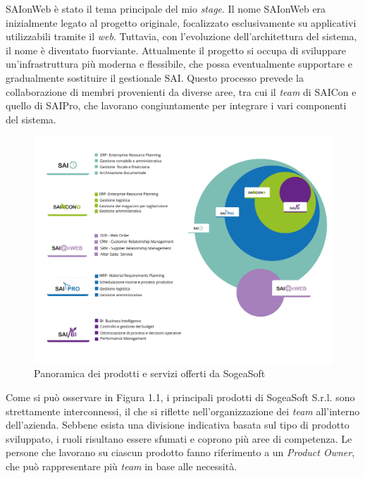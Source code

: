     \noindent SAIonWeb è stato il tema principale del mio \textit{stage}. Il nome SAIonWeb era inizialmente legato al progetto originale, focalizzato esclusivamente su applicativi utilizzabili tramite il \textit{web}. Tuttavia, con l'evoluzione dell'architettura del sistema, il nome è diventato fuorviante. Attualmente il progetto si occupa di sviluppare un'infrastruttura più moderna e flessibile, che possa eventualmente supportare e gradualmente sostituire il gestionale SAI. 
    Questo processo prevede la collaborazione di membri provenienti da diverse aree, tra cui il \textit{team} di SAICon e quello di SAIPro, che lavorano congiuntamente per integrare i vari componenti del sistema.\\

    \begin{figure}
        \centering
        \includegraphics[width=0.9\linewidth]{BCS-Tessi/images/SOGEAProdotti.png}
        \caption{Panoramica dei prodotti e servizi offerti da SogeaSoft}
        \label{fig:panoramica_prodotti}
    \end{figure}

    \noindent Come si può osservare in Figura 1.1, i principali prodotti di SogeaSoft S.r.l. sono strettamente interconnessi, il che si riflette nell’organizzazione dei \textit{team} all’interno dell’azienda. Sebbene esista una divisione indicativa basata sul tipo di prodotto sviluppato, i ruoli risultano essere sfumati e coprono più aree di competenza. 
    \noindent Le persone che lavorano su ciascun prodotto fanno riferimento a un \textit{Product Owner}, che può rappresentare più \textit{team} in base alle necessità.


